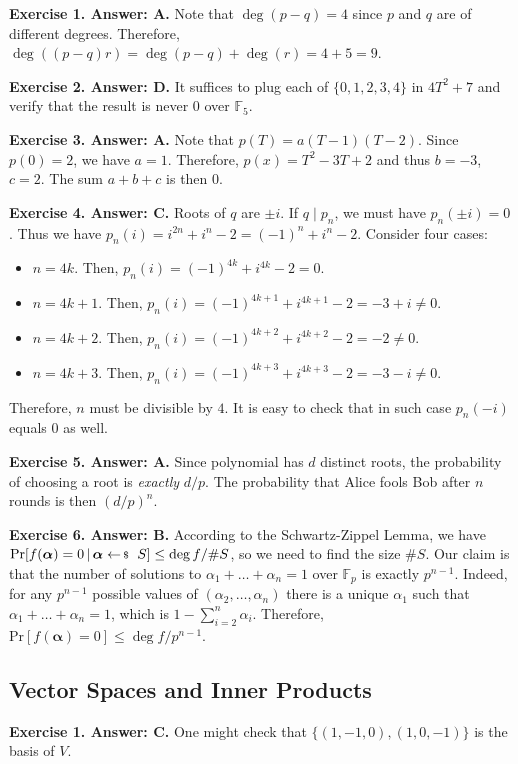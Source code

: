 \documentclass[../../book]{subfiles}
\begin{document}
\textbf{Exercise 1. Answer: A.} Note that $\deg(p-q)=4$ since $p$ and $q$ are of
different degrees. Therefore, $\deg((p-q)r)=\deg(p-q)+\deg(r) = 4+5=9$.

\textbf{Exercise 2. Answer: D.} It suffices to plug each of $\{0,1,2,3,4\}$
in $4T^2+7$ and verify that the result is never $0$ over $\mathbb{F}_5$.

\textbf{Exercise 3. Answer: A.} Note that $p(T)=a(T-1)(T-2)$. Since $p(0)=2$, 
we have $a=1$. Therefore, $p(x)=T^2-3T+2$ and thus $b=-3$, $c=2$. The sum 
$a+b+c$ is then $0$.

\textbf{Exercise 4. Answer: C.} Roots of $q$ are $\pm i$. If $q \mid p_n$,
we must have $p_n(\pm i) = 0$. Thus we have $p_n(i)=i^{2n}+i^n-2=(-1)^n+i^n-2$. 
Consider four cases:
\begin{itemize}
    \item $n=4k$. Then, $p_n(i)=(-1)^{4k}+i^{4k}-2=0$.
    \item $n=4k+1$. Then, $p_n(i)=(-1)^{4k+1}+i^{4k+1}-2=-3+i \neq 0$.
    \item $n=4k+2$. Then, $p_n(i)=(-1)^{4k+2}+i^{4k+2}-2=-2 \neq 0$.
    \item $n=4k+3$. Then, $p_n(i)=(-1)^{4k+3}+i^{4k+3}-2=-3-i \neq 0$.
\end{itemize}

Therefore, $n$ must be divisible by $4$. It is easy to check that in such 
case $p_n(-i)$ equals $0$ as well.

\textbf{Exercise 5. Answer: A.} Since polynomial has $d$ distinct roots,
the probability of choosing a root is \emph{exactly} $d/p$. The probability 
that Alice fools Bob after $n$ rounds is then $(d/p)^n$.

\textbf{Exercise 6. Answer: B.} According to the Schwartz-Zippel Lemma, we have
$\text{Pr}[f(\bm{\alpha})=0 \,|\, \bm{\alpha} \leftarrowS S] \leq \deg
f/\#S$, so we need to find the size $\#S$. Our claim is that 
the number of solutions to $\alpha_1+\dots+\alpha_n=1$ over $\mathbb{F}_p$ is exactly 
$p^{n-1}$. Indeed, for any $p^{n-1}$ possible values of $(\alpha_2,\dots,\alpha_n)$ there 
is a unique $\alpha_1$ such that $\alpha_1+\dots+\alpha_n=1$, which is $1-\sum_{i=2}^n\alpha_i$. 
Therefore, $\text{Pr}[f(\bm{\alpha})=0] \leq \deg f/p^{n-1}$.

\subsection*{Vector Spaces and Inner Products}

\textbf{Exercise 1. Answer: C.} One might check that $\{(1,-1,0),(1,0,-1)\}$ is the basis of $V$.
\end{document}
